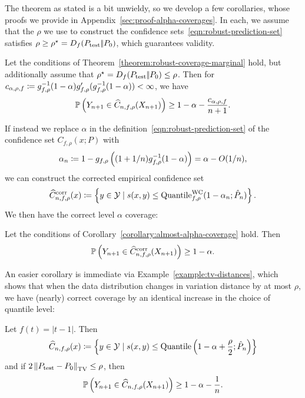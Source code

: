 The theorem as stated is a bit unwieldy, so we develop a few
corollaries, whose proofs we provide in
Appendix~\ref{sec:proof-alpha-coverages}. In each, we assume that the
$\rho$ we use to construct the confidence
sets~\eqref{eqn:robust-prediction-set} satisfies $\rho \ge \rho^\star =
D_{f}({P_{\textup{test}}} |\!| {P_0})$, which guarantees validity.
\begin{corollary}
  \label{corollary:almost-alpha-coverage}
  Let the conditions of Theorem~\ref{theorem:robust-coverage-marginal}
  hold, but additionally assume that
  $\rho^\star = D_{f}({P_{\textup{test}}} |\!| {P_0}) \le \rho$. Then
  for $c_{\alpha,\rho,f} \coloneqq g_{f,\rho}^{-1}(1 - \alpha) g_{f,\rho}'(
  g_{f,\rho}^{-1}(1 - \alpha)) < \infty$, we have
  \begin{equation*}
    \mathbb{P}\left(Y_{ n +1} \in \widehat{C}_{n,f,\rho}(X_{n+1})\right)
    \ge 1 - \alpha - \frac{c_{\alpha,\rho,f}}{n + 1}.
  \end{equation*}
\end{corollary}
\noindent
If instead
we replace $\alpha$ in the definition~\eqref{eqn:robust-prediction-set}
of the confidence set $C_{f,\rho}(x; P)$ with
\begin{equation*}
  \alpha_n \coloneqq 1 - g_{f,\rho}\left((1 + 1/n) g_{f,\rho}^{-1}(1 - \alpha)
  \right)
  = \alpha - O(1/n),
\end{equation*}
we can construct the corrected empirical confidence set
\begin{equation*}
  \widehat{C}_{n,f,\rho}^{\textup{corr}}(x)
  \coloneqq \left\{y \in \mathcal{Y} \mid s(x, y)
  \le \textup{Quantile}^{\textup{WC}}_{f,\rho}(1 - \alpha_n; \hat{P}_n) \right\}.
\end{equation*}
We then have the correct level $\alpha$ coverage:
\begin{corollary}
  \label{corollary:corrected-alpha-coverage}
  Let the conditions of Corollary~\ref{corollary:almost-alpha-coverage}
  hold. Then
  \begin{equation*}
    \mathbb{P}\left(Y_{n + 1} \in \widehat{C}_{n,f,\rho}^{\textup{corr}}(X_{n + 1})\right)
    \ge 1 - \alpha.
  \end{equation*}
\end{corollary}
\noindent
An easier corollary is immediate via Example~\ref{example:tv-distances},
which shows that when the data distribution changes in variation
distance by at most $\rho$, we have (nearly) correct coverage by
an identical increase in the choice of quantile level:
\begin{corollary} \label{corollary:total-variation}
  Let $f(t) = |t - 1|$. Then
  \begin{equation*}
    \widehat{C}_{n,f,\rho}(x) \coloneqq
    \left\{y \in \mathcal{Y} \mid s(x, y) \le
    \textup{Quantile}\left(1 - \alpha + \frac{\rho}{2}; \hat{P}_n\right)\right\}
  \end{equation*}
  and if $2 \left\|{P_{\textup{test}} - P_0}\right\|_{\rm TV} \le \rho$, then
  \begin{equation*}
    \mathbb{P}\left(Y_{n + 1} \in \widehat{C}_{n,f,\rho}(X_{n+1})\right)
    \ge 1 - \alpha - \frac{1}{n}.
  \end{equation*}
\end{corollary}

